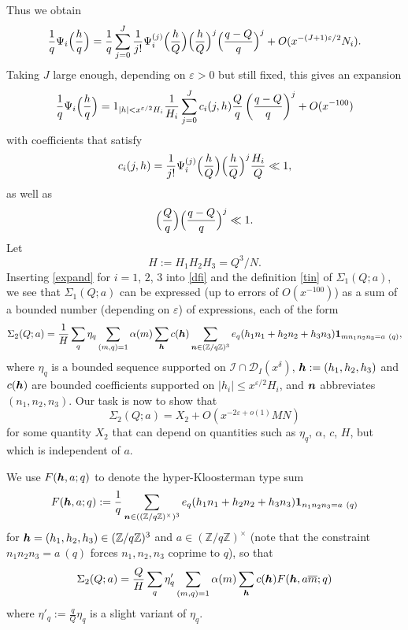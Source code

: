 \documentclass[12pt,a4paper,reqno]{amsart}
\numberwithin{equation}{section}
\theoremstyle{plain}
\theoremstyle{definition}
\newcommand\Z{\mathbb{Z}}
\newcommand\eps{\varepsilon}
\newcommand{\DIone}[2]{\mathcal{D}_{{#1}}({#2})}
\newcommand{\uple}[1]{\text{\boldmath${#1}$}}
\newcommand{\ftd}{\mathcal{I}}
\newcommand{\onef}{\mathbf{1}}
\begin{document}
Thus we obtain
$$
\frac{1}{q} \Psi_i\Bigl(\frac{h}{q}\Bigr)=
\frac{1}{q}\sum_{j=0}^J\frac{1}{j!}\Psi_i^{(j)}\Bigl(\frac{h}{Q}\Bigr)
\Bigl(\frac{h}{Q}\Bigr)^j \Bigl(\frac{q-Q}{q}\Bigr)^j
+O(x^{-(J+1)\eps/2}N_i).
$$
Taking $J$ large enough, depending on $\eps>0$ but still fixed, this gives an
expansion
\begin{equation}\label{expand}
\frac{1}{q} \Psi_i\Bigl(\frac{h}{q}\Bigr) = 1_{|h| < x^{\eps/2} H_i} \frac{1}{H_i} \sum_{j=0}^J
c_i(j,h) \frac{Q}{q}\left(\frac{q-Q}{q}\right)^j + O( x^{-100} )
\end{equation}
with coefficients that satisfy
$$
c_i(j,h)=\frac{1}{j!}\Psi_i^{(j)}\Bigl(\frac{h}{Q}\Bigr)
\Bigl(\frac{h}{Q}\Bigr)^j\frac{H_i}{Q}\ll 1,
$$
as well as
$$
\Bigl(\frac{Q}{q}\Bigr) \Bigl(\frac{q-Q}{q}\Bigr)^j\ll 1.
$$
Let
\begin{equation}\label{eq-def-h}
H:=H_1H_2H_3=Q^3/N.
\end{equation}
Inserting \eqref{expand} for $i=1$, $2$, $3$ into \eqref{dfi} and the definition \eqref{tin} of
$\Sigma_1(Q;a)$, we see that $\Sigma_1(Q;a)$ can be expressed (up to errors of $O(x^{-100})$) as a sum
of a bounded number (depending on $\eps$) of expressions, each of the form
$$
\Sigma_2(Q;a)=\frac{1}{H} \sum_q \eta_q \sum_{(m,q)=1} \alpha(m)
\sum_{\uple{h}} c(\uple{h}) \sum_{\uple{n}\in (\Z/q\Z)^3} e_{q}( h_1
n_1 + h_2 n_2 + h_3 n_3 ) \onef_{mn_1n_2n_3 = a\ (q)},
$$
where $\eta_q$ is a bounded sequence supported on $\ftd\cap
\DIone{I}{x^{\delta}}$, $\uple{h}:=(h_1,h_2,h_3)$ and $c(\uple{h})$ are
bounded coefficients supported on $|h_i|\leq x^{\eps/2}H_i$, and
$\uple{n}$ abbreviates $(n_1,n_2,n_3)$.
 Our task is now to show that
$$
\Sigma_2(Q;a)  = X_2 + O( x^{-2\eps+o(1)} M N  )
$$
for some quantity $X_2$ that can depend on quantities such as $\eta_q$, $\alpha$, $c$, $H$, but which is independent of $a$.
\par
We use $F(\uple{h}, a; q)$ to denote the hyper-Kloosterman type sum
\begin{equation}\label{fuple-def}
F(\uple{h}, a; q) := \frac{1}{q} \sum_{\uple{n}\in
  ((\Z/q\Z)^\times)^3} e_{q}( h_1 n_1 + h_2 n_2 + h_3 n_3 )
\onef_{n_1n_2n_3 = a\ (q)}
\end{equation}
for $\uple{h}=(h_1,h_2,h_3) \in (\Z/q\Z)^3$ and $a \in
(\Z/q\Z)^\times$ (note that the constraint $n_1n_2n_3=a\ (q)$ forces $n_1,n_2,n_3$ coprime to $q$), so that 
$$
\Sigma_2(Q;a)=\frac{Q}{H} \sum_q \eta'_q \sum_{(m,q)=1} \alpha(m)
\sum_{\uple{h}} c(\uple{h}) F(\uple{h},a\overline{m};q)
$$
where $\eta'_q := \frac{q}{Q} \eta_q$ is a slight variant of $\eta_q$.
\end{document}
